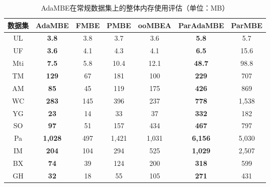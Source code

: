 \begin{table} [H]
	\centering    
	\setlength{\abovecaptionskip}{0cm}  
  \setlength{\belowcaptionskip}{-0.1cm}
	\caption{AdaMBE在常规数据集上的整体内存使用评估（单位：MB）}      
	\label{tbl:ada_memory}
	\setlength{\tabcolsep}{5pt}
	\begin{center}
				\normalsize{
		\begin{tabular}{ccccc|cc}
			\hline 

      \textbf{数据集} & \textbf{AdaMBE} & \textbf{FMBE} & \textbf{PMBE} & \textbf{ooMBEA} & \textbf{ParAdaMBE} & \textbf{ParMBE} \\ \hline

      UL & \textbf{3.8} & 3.8 & 3.7 & 3.6 & \textbf{5.8} & 5.7 \\
      UF & \textbf{3.6} & 4.1 & 4.3 & 4.1 & \textbf{6.5} & 15.6 \\
      Mti & \textbf{7.5} & 5.8 & 10.4 & 12.1 & \textbf{48.7} & 98.8 \\
      TM & \textbf{129} & 67 & 181 & 100 & \textbf{229} & 707 \\
      AM & \textbf{85} & 45 & 119 & 175 & \textbf{426} & 869 \\
      WC & \textbf{283} & 145 & 396 & 237 & \textbf{778} & 1,538 \\
      YG & \textbf{23} & 14 & 33 & 37 & \textbf{332} & 182 \\
      SO & \textbf{97} & 51 & 157 & 434 & \textbf{467} & 797 \\
      Pa & \textbf{1,028} & 497 & 1,421 & 1,031 & \textbf{6,156} & 5,030 \\
      IM & \textbf{204} & 104 & 294 & 525 & \textbf{1,029} & 2,507 \\
      BX & \textbf{74} & 39 & 124 & 200 & \textbf{318} & 599 \\
      GH & \textbf{32} & 18 & 55 & 105 & \textbf{271} & 431 \\
      
      \hline
      
		\end{tabular}
				}
	\end{center}
  \vspace{-8pt}
\end{table}

